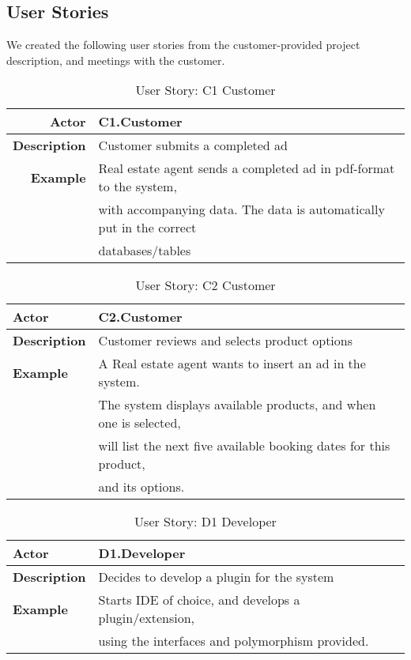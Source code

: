 \subsection{User Stories}

We created the following user stories from the customer-provided project
description, and meetings with the customer.

\begin{table}[H]
\begin{tabular}{| r | l |}
	\hline
	\textbf{Actor} & C1.Customer \\
	\hline
	\textbf{Description} & Customer submits a completed ad \\
	\hline
	\textbf{Example} & Real estate agent sends a completed ad in pdf-format to the system,\\
	& with accompanying data. The data is automatically put in the correct\\
	& databases/tables \\
	\hline
\end{tabular}
\caption{User Story: C1 Customer}
\end{table}

\begin{table}[H]
\begin{tabular}{| l | l |}
	\hline
	\textbf{Actor} & C2.Customer \\
	\hline
	\textbf{Description} & Customer reviews and selects product options \\
	\hline
	\textbf{Example} & A Real estate agent wants to insert an ad in the system.\\
	& The system displays available products, and when one is selected,\\
	& will list the next five available booking dates for this product,\\
	& and its options.\\
	\hline
\end{tabular}
\caption{User Story: C2 Customer}
\end{table}

\begin{table}[H]
\begin{tabular}{| l | l |}
	\hline
	\textbf{Actor} & D1.Developer \\
	\hline
	\textbf{Description} & Decides to develop a plugin for the system \\
	\hline
	\textbf{Example} & Starts IDE of choice, and develops a plugin/extension,\\
	& using the interfaces and polymorphism provided. \\
	\hline
\end{tabular}
\caption{User Story: D1 Developer}
\end{table}

